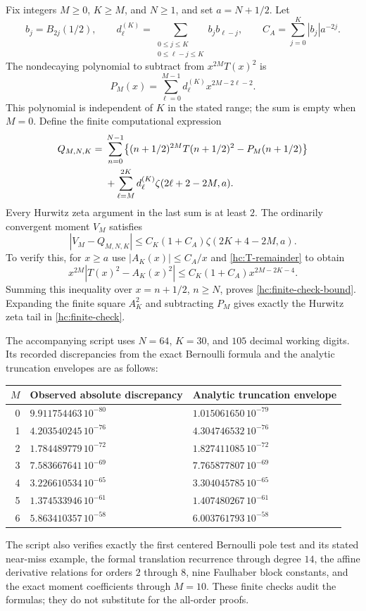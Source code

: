 Fix integers $M\ge0$, $K\ge M$, and $N\ge1$, and set $a=N+1/2$.
Let
\[
 b_j=B_{2j}(1/2),\qquad
 d_\ell^{(K)}=
 \sum_{\substack{0\le j\le K\\0\le\ell-j\le K}}
                    b_jb_{\ell-j},
 \qquad
 C_A=\sum_{j=0}^{K}|b_j|a^{-2j}.
\]
The nondecaying polynomial to subtract from $x^{2M}T(x)^2$ is
\[
 P_M(x)=\sum_{\ell=0}^{M-1}
                  d_\ell^{(K)}x^{2M-2\ell-2}.
\]
This polynomial is independent of $K$ in the stated range; the sum is
empty when $M=0$. Define the finite computational expression
\begin{align}\label{hc:finite-check}
 Q_{M,N,K}={}&
 \sum_{n=0}^{N-1}
   \bigl\{(n+1/2)^{2M}T(n+1/2)^2-P_M(n+1/2)\bigr\}\notag\\
 &+\sum_{\ell=M}^{2K}
          d_\ell^{(K)}\zeta(2\ell+2-2M,a).
\end{align}
Every Hurwitz zeta argument in the last sum is at least $2$.
The ordinarily convergent moment $V_M$ satisfies
\begin{equation}\label{hc:finite-check-bound}
 |V_M-Q_{M,N,K}|
 \le C_K(1+C_A)\zeta(2K+4-2M,a).
\end{equation}
To verify this, for $x\ge a$ use $|A_K(x)|\le C_A/x$ and
\eqref{hc:T-remainder} to obtain
\[
 x^{2M}|T(x)^2-A_K(x)^2|
 \le C_K(1+C_A)x^{2M-2K-4}.
\]
Summing this inequality over $x=n+1/2$, $n\ge N$, proves
\eqref{hc:finite-check-bound}. Expanding the finite square $A_K^2$
and subtracting $P_M$ gives exactly the Hurwitz zeta tail in
\eqref{hc:finite-check}.

The accompanying script uses $N=64$, $K=30$, and $105$ decimal
working digits. Its recorded discrepancies from the exact Bernoulli
formula and the analytic truncation envelopes are as follows:
\begin{center}
\begin{tabular}{rll}
\hline
$M$ & Observed absolute discrepancy & Analytic truncation envelope\\
\hline
0 & $9.911754463\,10^{-80}$ & $1.015061650\,10^{-79}$\\
1 & $4.203540245\,10^{-76}$ & $4.304746532\,10^{-76}$\\
2 & $1.784489779\,10^{-72}$ & $1.827411085\,10^{-72}$\\
3 & $7.583667641\,10^{-69}$ & $7.765877807\,10^{-69}$\\
4 & $3.226610534\,10^{-65}$ & $3.304045785\,10^{-65}$\\
5 & $1.374533946\,10^{-61}$ & $1.407480267\,10^{-61}$\\
6 & $5.863410357\,10^{-58}$ & $6.003761793\,10^{-58}$\\
\hline
\end{tabular}
\end{center}
The script also verifies exactly the first centered Bernoulli pole
test and its stated near-miss example, the formal translation recurrence
through degree $14$, the affine derivative relations for orders $2$
through $8$, nine Faulhaber block constants, and the exact moment
coefficients through $M=10$. These finite checks audit the formulas;
they do not substitute for the all-order proofs.

